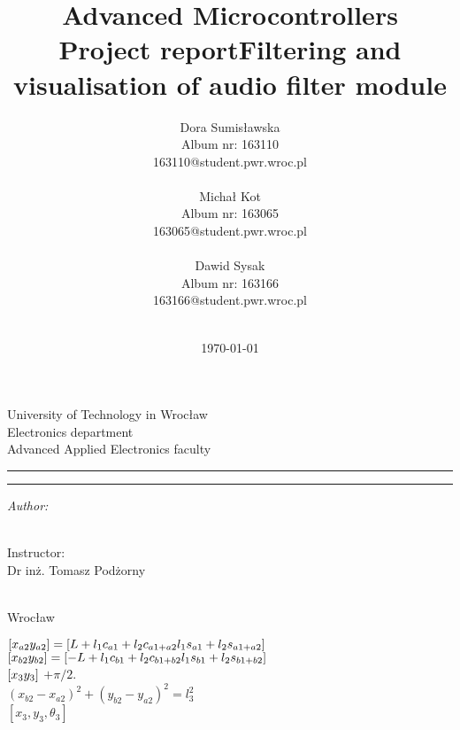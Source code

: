 \documentclass[12pt,a4paper,polish]{article}
\date{\today}
\title{Advanced Microcontrollers\\ Project report}
\author{Dora Sumisławska\\Album nr: 163110 \\163110@student.pwr.wroc.pl\\\\
Michał Kot\\Album nr: 163065 \\163065@student.pwr.wroc.pl\\\\
Dawid Sysak\\Album nr: 163166 \\163166@student.pwr.wroc.pl\\\\}
\title{Filtering and visualisation of audio filter module}
\makeatletter
\newcommand{\linia}{\rule{\linewidth}{0.4mm}}
\renewcommand{\maketitle}{\begin{titlepage}
    \vspace*{1cm}
    \begin{center}\small
    University of Technology in Wrocław\\
    Electronics department\\
    Advanced Applied Electronics faculty
    \end{center}
    \vspace{3cm}
    \noindent\linia
    \begin{center}
      \LARGE \textsc{\@title}
         \end{center}
     \linia
    \vspace{0.5cm}
    \begin{flushright}
    \begin{minipage}{5cm}
    \textit{\small Author:}\\
    \normalsize \textsc{\@author} \par
    \end{minipage}
    \vspace{2.5cm}
    \hspace{8cm}\\
     {\small Instructor:}\\
        Dr inż. Tomasz Podżorny
     \end{flushright}  
    \vspace*{\stretch{5}}
    \begin{center}
    \@date\\
    Wrocław
    \end{center}
  \end{titlepage}%
}
\makeatother
\begin{document}
\maketitle
$
[x_{a2}\\y_{a2}]=[L+l_1 c_{a1} +l_2 c_{a1+a2}\\l_1 s_{a1} +l_2 s_{a1+a2}]$ \\
$[x_{b2}\\y_{b2}]=[-L+l_1 c_{b1} +l_2 c_{b1+b2}\\l_1 s_{b1} +l_2 s_{b1+b2}] $ \\
$[x_3\\y_3] $
$+\pi/2. $ \\
$(x_{b2}-x_{a2})^2+(y_{b2}-y_{a2})^2=l_3^2 $ \\
$[x_3,y_3,\theta_3] $ \\
\end{document}
